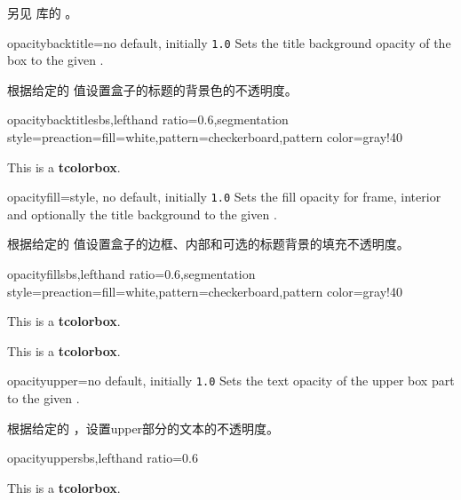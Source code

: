 另见  库的 。



\begin{docTcbKey}{opacitybacktitle}{=}{no default, initially \texttt{1.0}}
Sets the title background opacity of the box to the given .

根据给定的  值设置盒子的标题的背景色的不透明度。
\begin{exdispExample*}{opacitybacktitle}{sbs,lefthand ratio=0.6,segmentation style={preaction={fill=white},pattern=checkerboard,pattern color=gray!40}}
\begin{tcolorbox}[standard jigsaw,colframe=red,
opacityframe=0.5, opacitybacktitle=0.5,
title filled, title=This is a title]
This is a \textbf{tcolorbox}.
\end{tcolorbox}
\end{exdispExample*}
\end{docTcbKey}


\begin{docTcbKey}{opacityfill}{=}{style, no default, initially \texttt{1.0}}
Sets the fill opacity for frame, interior and optionally the title background
to the given .

根据给定的  值设置盒子的边框、内部和可选的标题背景的填充不透明度。
\begin{exdispExample*}{opacityfill}{sbs,lefthand ratio=0.6,segmentation style={preaction={fill=white},pattern=checkerboard,pattern color=gray!40}}
\begin{tcolorbox}[standard jigsaw,colframe=red,
opacityfill=0.7, title=This is a title]
This is a \textbf{tcolorbox}.
\end{tcolorbox}
\begin{tcolorbox}[standard jigsaw,colframe=red,
title=This is a title]
This is a \textbf{tcolorbox}.
\end{tcolorbox}
\end{exdispExample*}
\end{docTcbKey}





 \clearpage
\begin{docTcbKey}{opacityupper}{=}{no default, initially \texttt{1.0}}
Sets the text opacity of the upper box part to the given .

根据给定的 ，设置upper部分的文本的不透明度。
\begin{exdispExample*}{opacityupper}{sbs,lefthand ratio=0.6}
\begin{tcolorbox}[enhanced,opacityupper=0.5
,interior style={preaction={fill=white}
,pattern=checkerboard
,pattern color=gray!40}]
This is a \textbf{tcolorbox}.
\end{tcolorbox}
\end{exdispExample*}
\end{docTcbKey}



